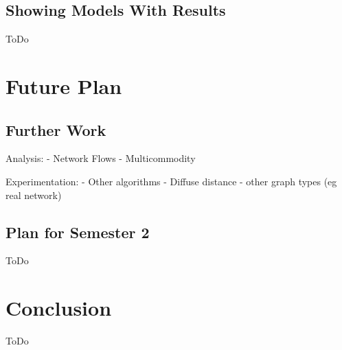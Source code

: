 \documentclass[bsc,frontabs,twoside,singlespacing,parskip,deptreport]{infthesis}     %
\begin{document}
\section{Showing Models With Results}
ToDo

\chapter{Future Plan}
\section{Further Work}
Analysis:
- Network Flows
- Multicommodity

Experimentation:
- Other algorithms
- Diffuse distance
- other graph types (eg real network)


\section{Plan for Semester 2}
ToDo
\chapter{Conclusion}
ToDo



\end{document}
